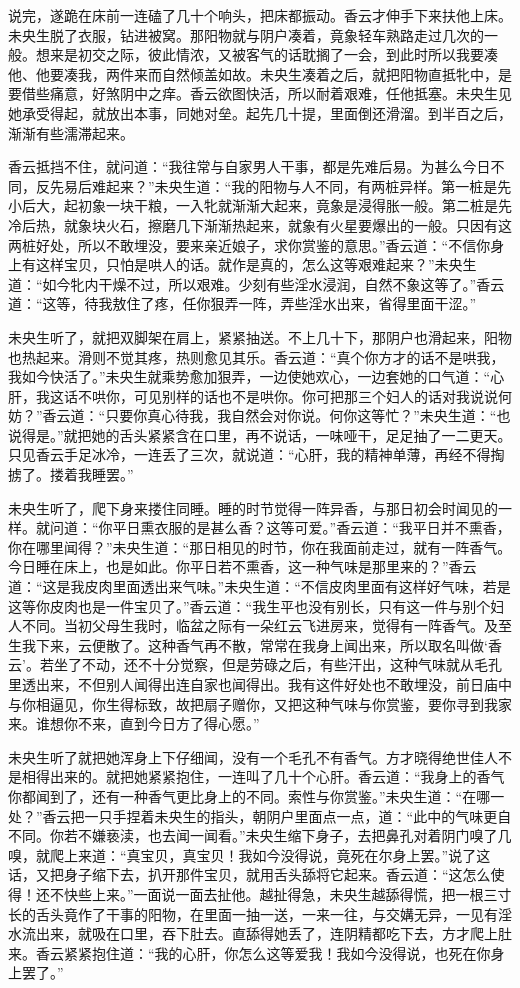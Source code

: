 \documentclass[a4paper,12pt,UTF8,twoside]{ctexbook}
\begin{document}
说完，遂跪在床前一连磕了几十个响头，把床都振动。香云才伸手下来扶他上床。未央生脱了衣服，钻进被窝。那阳物就与阴户凑着，竟象轻车熟路走过几次的一般。想来是初交之际，彼此情浓，又被客气的话耽搁了一会，到此时所以我要凑他、他要凑我，两件来而自然倾盖如故。未央生凑着之后，就把阳物直抵牝中，是要借些痛意，好煞阴中之痒。香云欲图快活，所以耐着艰难，任他抵塞。未央生见她承受得起，就放出本事，同她对垒。起先几十提，里面倒还滑溜。到半百之后，渐渐有些濡滞起来。

香云抵挡不住，就问道：“我往常与自家男人干事，都是先难后易。为甚么今日不同，反先易后难起来？”未央生道：“我的阳物与人不同，有两桩异样。第一桩是先小后大，起初象一块干粮，一入牝就渐渐大起来，竟象是浸得胀一般。第二桩是先冷后热，就象块火石，擦磨几下渐渐热起来，就象有火星要爆出的一般。只因有这两桩好处，所以不敢埋没，要来亲近娘子，求你赏鉴的意思。”香云道：“不信你身上有这样宝贝，只怕是哄人的话。就作是真的，怎么这等艰难起来？”未央生道：“如今牝内干燥不过，所以艰难。少刻有些淫水浸润，自然不象这等了。”香云道：“这等，待我敖住了疼，任你狠弄一阵，弄些淫水出来，省得里面干涩。”

未央生听了，就把双脚架在肩上，紧紧抽送。不上几十下，那阴户也滑起来，阳物也热起来。滑则不觉其疼，热则愈见其乐。香云道：“真个你方才的话不是哄我，我如今快活了。”未央生就乘势愈加狠弄，一边使她欢心，一边套她的口气道：“心肝，我这话不哄你，可见别样的话也不是哄你。你可把那三个妇人的话对我说说何妨？”香云道：“只要你真心待我，我自然会对你说。何你这等忙？”未央生道：“也说得是。”就把她的舌头紧紧含在口里，再不说话，一味哑干，足足抽了一二更天。只见香云手足冰冷，一连丢了三次，就说道：“心肝，我的精神单薄，再经不得掏掳了。搂着我睡罢。”

未央生听了，爬下身来搂住同睡。睡的时节觉得一阵异香，与那日初会时闻见的一样。就问道：“你平日熏衣服的是甚么香？这等可爱。”香云道：“我平日并不熏香，你在哪里闻得？”未央生道：“那日相见的时节，你在我面前走过，就有一阵香气。今日睡在床上，也是如此。你平日若不熏香，这一种气味是那里来的？”香云道：“这是我皮肉里面透出来气味。”未央生道：“不信皮肉里面有这样好气味，若是这等你皮肉也是一件宝贝了。”香云道：“我生平也没有别长，只有这一件与别个妇人不同。当初父母生我时，临盆之际有一朵红云飞进房来，觉得有一阵香气。及至生我下来，云便散了。这种香气再不散，常常在我身上闻出来，所以取名叫做‘香云’。若坐了不动，还不十分觉察，但是劳碌之后，有些汗出，这种气味就从毛孔里透出来，不但别人闻得出连自家也闻得出。我有这件好处也不敢埋没，前日庙中与你相逼见，你生得标致，故把扇子赠你，又把这种气味与你赏鉴，要你寻到我家来。谁想你不来，直到今日方了得心愿。”

未央生听了就把她浑身上下仔细闻，没有一个毛孔不有香气。方才晓得绝世佳人不是相得出来的。就把她紧紧抱住，一连叫了几十个心肝。香云道：“我身上的香气你都闻到了，还有一种香气更比身上的不同。索性与你赏鉴。”未央生道：“在哪一处？”香云把一只手捏着未央生的指头，朝阴户里面点一点，道：“此中的气味更自不同。你若不嫌亵渎，也去闻一闻看。”未央生缩下身子，去把鼻孔对着阴门嗅了几嗅，就爬上来道：“真宝贝，真宝贝！我如今没得说，竟死在尔身上罢。”说了这话，又把身子缩下去，扒开那件宝贝，就用舌头舔将它起来。香云道：“这怎么使得！还不快些上来。”一面说一面去扯他。越扯得急，未央生越舔得慌，把一根三寸长的舌头竟作了干事的阳物，在里面一抽一送，一来一往，与交媾无异，一见有淫水流出来，就吸在口里，吞下肚去。直舔得她丢了，连阴精都吃下去，方才爬上肚来。香云紧紧抱住道：“我的心肝，你怎么这等爱我！我如今没得说，也死在你身上罢了。”
\end{document}
